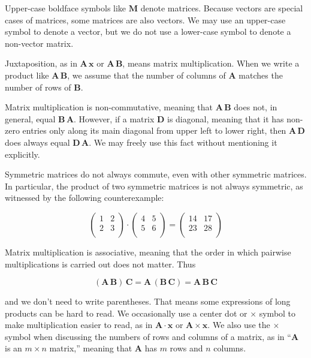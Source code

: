 \documentclass[10pt,oneside,x11names]{article}
\begin{document}
Upper-case
boldface symbols like \(\mathbold{M}\) denote matrices. Because vectors are
special cases of matrices, some matrices are also vectors. We may use an
upper-case symbol to denote a vector, but we do not use a lower-case symbol to
denote a non-vector matrix.

Juxtaposition, as in
\(\mathbold{A}\,\mathbold{x}\) or \(\mathbold{A}\,\mathbold{B}\), means matrix
multiplication.
When we write a product like
\(\mathbold{A}\,\mathbold{B}\), we assume that the number of columns of
\(\mathbold{A}\) matches the number of rows of \(\mathbold{B}\). 

Matrix multiplication is non-commutative, meaning that
\(\mathbold{A}\,\mathbold{B}\) does not, in general, equal
\(\mathbold{B}\,\mathbold{A}\). However, if a matrix \(\mathbold{D}\) is diagonal,
meaning that it has non-zero entries only along its main diagonal from upper
left to lower right, then \(\mathbold{A}\,\mathbold{D}\) does always equal
\(\mathbold{D}\,\mathbold{A}\). We may freely use this fact without mentioning it
explicitly.

Symmetric matrices do not always
commute, even with other symmetric matrices. In particular, the product of two
symmetric matrices is not always symmetric, as witnessed by the following
counterexample:

\begin{equation*}
\left(
\begin{array}{cc}
 1 & 2 \\
 2 & 3 \\
\end{array}
\right)\cdot\left(
\begin{array}{cc}
 4 & 5 \\
 5 & 6 \\
\end{array}
\right)
=
\left(
\begin{array}{cc}
 14 & 17 \\
 23 & 28 \\
\end{array}
\right)
\end{equation*}


Matrix multiplication is associative, meaning that the order in which pairwise
multiplications is carried out does not matter. Thus 

\[(\mathbold{A}\,\mathbold{B})\,\mathbold{C}=\mathbold{A}\,(\mathbold{B}\,\mathbold{C})=\mathbold{A}\,\mathbold{B}\,\mathbold{C}\]

\noindent and we don't need to write parentheses. That means
some expressions of long products can be hard to read. We occasionally use
a center dot or \(\times\) symbol to make multiplication easier to read, as in
\(\mathbold{A}\cdot\mathbold{x}\) or \(\mathbold{A}\times\mathbold{x}\). We also use
the \(\times\) symbol when discussing the numbers of rows and columns of a matrix,
as in ``\(\mathbold{A}\) is an \(m\times n\) matrix,'' meaning that \(\mathbold{A}\)
has \(m\) rows and \(n\) columns.
\end{document}
